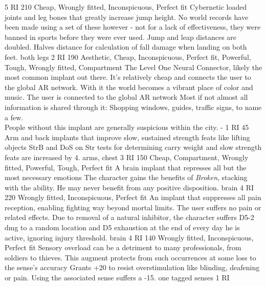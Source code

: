 \begin{multicols}{2}
    {5 RI}
    {210}
    {Cheap, Wrongly fitted, Inconspicuous, Perfect fit}
    {Cybernetic loaded joints and leg bones that greatly increase jump height. No world records have been made using a set of these however - not for a lack of effectiveness, they were banned in sports before they were ever used.}
    {Jump and leap distances are doubled. Halves distance for calculation of fall damage when landing on both feet.}
    {both legs}
    {2 RI}
    {190}
    {Aesthetic, Cheap, Inconspicuous, Perfect fit, Powerful, Tough, Wrongly fitted, Compartment}
	{
		\label{implant:l1nc}
	The Level One Neural Connector, likely the most common implant out there.
	It's relatively cheap and connects the user to the global AR network.
	With it the world becomes a vibrant place of color and music.}
	{The user is connected to the global AR network
	Most if not almost all information is shared through it:
	Shopping windows,
		guides,
		traffic signs,
		to name a few.
	\\%
	People without this implant are generally suspicious within the city.
	}
	{-}
	{1 RI}
	{45}
	{}
    {Arm and back implants that improve slow, sustained strength feats like lifting objects}
    {StrB and DoS on Str tests for determining carry weight and slow strength feats are increased by 4.}
    {arms, chest}
    {3 RI}
    {150}
    {Cheap, Compartment, Wrongly fitted, Powerful, Tough, Perfect fit}
    {A brain implant that represses all but the most necessary emotions}
    {The character gains the benefits of \emph{Broken}, stacking with the ability. He may never benefit from any positive disposition.}
    {brain}
    {4 RI}
    {220}
    {Wrongly fitted, Inconspicuous, Perfect fit}
    {An implant that suppresses all pain reception, enabling fighting way beyond mortal limits.}
    {The user suffers no pain or related effects.
	   Due to removal of a natural inhibitor, the character suffers D5-2 dmg to a random location and D5 exhaustion at the end of every day he is active, ignoring injury threshold.}
    {brain}
    {4 RI}
    {140}
    {Wrongly fitted, Inconspicuous, Perfect fit}
    {Sensory overload can be a detriment to many professionals, from soldiers to thieves. This augment protects from such occurrences at some loss to the sense's accuracy}
    {Grants +20 to resist overstimulation like blinding, deafening or pain. Using the associated sense suffers a -15.}
    {one tagged senses}
    {1 RI}

\end{multicols}
